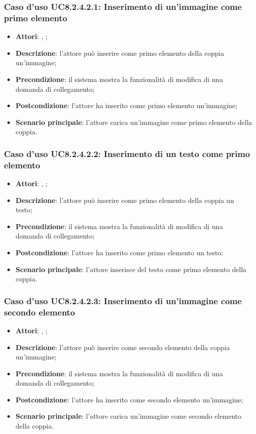 		\subsubsection{Caso d'uso UC8.2.4.2.1: Inserimento di un'immagine come primo elemento}
		\label{UC8.2.4.2.1}
		\begin{itemize}
			\item \textbf{Attori}: \uau, \uaupro;
			\item \textbf{Descrizione}: l'attore può inserire come primo elemento della coppia un'immagine;
			\item \textbf{Precondizione}: il sistema mostra la funzionalità di modifica di una domanda di collegamento; 
			\item \textbf{Postcondizione}: l'attore ha inserito come primo elemento un'immagine;
			\item \textbf{Scenario principale}: l'attore carica un'immagine come primo elemento della coppia.
		\end{itemize}
		
		\subsubsection{Caso d'uso UC8.2.4.2.2: Inserimento di un testo come primo elemento}
		\label{UC8.2.4.2.2}
		\begin{itemize}
			\item \textbf{Attori}: \uau, \uaupro;
			\item \textbf{Descrizione}: l'attore può inserire come primo elemento della coppia un testo;
			\item \textbf{Precondizione}: il sistema mostra la funzionalità di modifica di una domanda di collegamento; 
			\item \textbf{Postcondizione}: l'attore ha inserito come primo elemento un testo;
			\item \textbf{Scenario principale}: l'attore inserisce del testo come primo elemento della coppia.
		\end{itemize}
		
			\subsubsection{Caso d'uso UC8.2.4.2.3: Inserimento di un'immagine come secondo elemento}
		\label{UC8.2.4.2.3}
		\begin{itemize}
			\item \textbf{Attori}: \uau, \uaupro;
			\item \textbf{Descrizione}: l'attore può inserire come secondo elemento della coppia un'immagine;
			\item \textbf{Precondizione}: il sistema mostra la funzionalità di modifica di una domanda di collegamento; 
			\item \textbf{Postcondizione}: l'attore ha inserito come secondo elemento un'immagine;
			\item \textbf{Scenario principale}: l'attore carica un'immagine come secondo elemento della coppia.
		\end{itemize}
		
